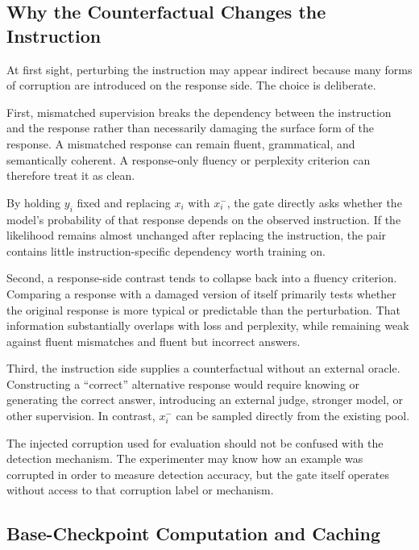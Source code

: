 \subsection{Why the Counterfactual Changes the Instruction}
\label{app:gate-why-instruction}

At first sight, perturbing the instruction may appear indirect because
many forms of corruption are introduced on the response side. The
choice is deliberate.

First, mismatched supervision breaks the dependency between the
instruction and the response rather than necessarily damaging the
surface form of the response. A mismatched response can remain fluent,
grammatical, and semantically coherent. A response-only fluency or
perplexity criterion can therefore treat it as clean.

By holding \(y_i\) fixed and replacing \(x_i\) with \(x_i^{-}\), the
gate directly asks whether the model's probability of that response
depends on the observed instruction. If the likelihood remains almost
unchanged after replacing the instruction, the pair contains little
instruction-specific dependency worth training on.

Second, a response-side contrast tends to collapse back into a
fluency criterion. Comparing a response with a damaged version of
itself primarily tests whether the original response is more typical
or predictable than the perturbation. That information substantially
overlaps with loss and perplexity, while remaining weak against fluent
mismatches and fluent but incorrect answers.

Third, the instruction side supplies a counterfactual without an
external oracle. Constructing a ``correct'' alternative response would
require knowing or generating the correct answer, introducing an
external judge, stronger model, or other supervision. In contrast,
\(x_i^{-}\) can be sampled directly from the existing pool.

The injected corruption used for evaluation should not be confused
with the detection mechanism. The experimenter may know how an
example was corrupted in order to measure detection accuracy, but the
gate itself operates without access to that corruption label or
mechanism.


\subsection{Base-Checkpoint Computation and Caching}
\label{app:gate-cache}

